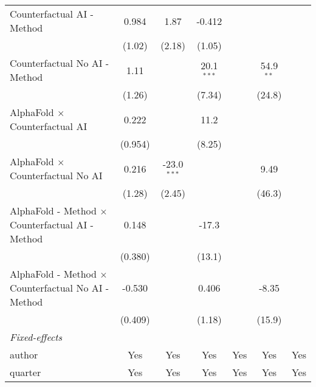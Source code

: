\begin{tabular}{lcccccc}
   Counterfactual AI - Method                                 & 0.984        & 1.87          & -0.412       &         &              &   \\   
                                                              & (1.02)       & (2.18)        & (1.05)       &         &              &   \\   
   Counterfactual No AI - Method                              & 1.11         &               & 20.1$^{***}$ &         & 54.9$^{**}$  &   \\   
                                                              & (1.26)       &               & (7.34)       &         & (24.8)       &   \\   
   AlphaFold $\times$ Counterfactual AI                       & 0.222        &               & 11.2         &         &              &   \\   
                                                              & (0.954)      &               & (8.25)       &         &              &   \\   
   AlphaFold $\times$ Counterfactual No AI                    & 0.216        & -23.0$^{***}$ &              &         & 9.49         &   \\   
                                                              & (1.28)       & (2.45)        &              &         & (46.3)       &   \\   
   AlphaFold - Method $\times$ Counterfactual AI - Method     & 0.148        &               & -17.3        &         &              &   \\   
                                                              & (0.380)      &               & (13.1)       &         &              &   \\   
   AlphaFold - Method $\times$ Counterfactual No AI - Method  & -0.530       &               & 0.406        &         & -8.35        &   \\   
                                                              & (0.409)      &               & (1.18)       &         & (15.9)       &   \\   
   \midrule
   \emph{Fixed-effects}\\
   author                                                     & Yes          & Yes           & Yes          & Yes     & Yes          & Yes\\  
   quarter                                                    & Yes          & Yes           & Yes          & Yes     & Yes          & Yes\\  

\end{tabular}
